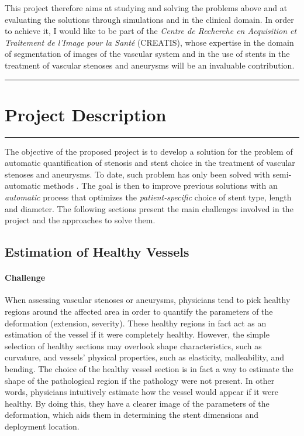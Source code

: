 \documentclass[a4paper]{article}
\newcommand{\challenge}{\paragraph{Challenge}}
\newcommand{\citep}{\cite}
\begin{document}
This project therefore aims at studying and solving the problems above and at evaluating the solutions through simulations and in the clinical domain. In order to achieve it, I would like to be part of the {\em Centre de Recherche en Acquisition et Traitement de l'Image pour la Sant\'e} (CREATIS), whose expertise in the domain of segmentation of images of the vascular system and in the use of stents in the treatment of vascular stenoses and aneurysms will be an invaluable contribution.

\medskip
\medskip

\pagebreak

\hrule
\section{Project Description}
\hrule

\medskip
\medskip

The objective of the proposed project is to develop a solution for the problem of automatic quantification of stenosis and stent choice in the treatment of vascular stenoses and aneurysms. To date, such problem has only been solved with semi-automatic methods \citep{Gremse01092011,Scherl200721,HERN-06b,Bemmel}. The goal is then to improve previous solutions with an {\em automatic} process that optimizes the {\em patient-specific} choice of stent type, length and diameter. The following sections present the main challenges involved in the project and the approaches to solve them. 

\subsection{Estimation of Healthy Vessels}

\challenge
When assessing vascular stenoses or aneurysms, physicians tend to pick healthy regions around the affected area in order to quantify the parameters of the deformation (extension, severity). These healthy regions in fact act as an estimation of the vessel if it were completely healthy. However, the simple selection of healthy sections may overlook shape characteristics, such as curvature, and vessels' physical properties, such as elasticity, malleability, and bending. The choice of the healthy vessel section is in fact a way to estimate the shape of the pathological region if the pathology were not present. In other words, physicians intuitively estimate how the vessel would appear if it were healthy. By doing this, they have a clearer image of the parameters of the deformation, which aids them in determining the stent dimensions and deployment location.
\end{document}
